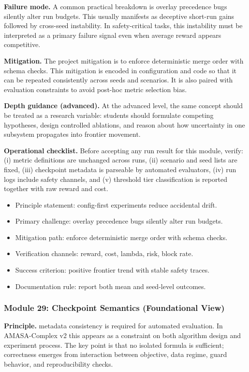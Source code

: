 \documentclass[conference]{IEEEtran}
\begin{document}
\textbf{Failure mode.} A common practical breakdown is overlay precedence bugs silently alter run budgets. This usually manifests as deceptive short-run gains followed by cross-seed instability. In safety-critical tasks, this instability must be interpreted as a primary failure signal even when average reward appears competitive.

\textbf{Mitigation.} The project mitigation is to enforce deterministic merge order with schema checks. This mitigation is encoded in configuration and code so that it can be repeated consistently across seeds and scenarios. It is also paired with evaluation constraints to avoid post-hoc metric selection bias.

\textbf{Depth guidance (advanced).} At the advanced level, the same concept should be treated as a research variable: students should formulate competing hypotheses, design controlled ablations, and reason about how uncertainty in one subsystem propagates into frontier movement.

\textbf{Operational checklist.} Before accepting any run result for this module, verify: (i) metric definitions are unchanged across runs, (ii) scenario and seed lists are fixed, (iii) checkpoint metadata is parseable by automated evaluators, (iv) run logs include safety channels, and (v) threshold tier classification is reported together with raw reward and cost.

\begin{itemize}[leftmargin=*]
  \item Principle statement: config-first experiments reduce accidental drift.
  \item Primary challenge: overlay precedence bugs silently alter run budgets.
  \item Mitigation path: enforce deterministic merge order with schema checks.
  \item Verification channels: reward, cost, lambda, risk, block rate.
  \item Success criterion: positive frontier trend with stable safety traces.
  \item Documentation rule: report both mean and seed-level outcomes.
\end{itemize}


\subsubsection{Module 29: Checkpoint Semantics (Foundational View)}
\textbf{Principle.} metadata consistency is required for automated evaluation. In AMASA-Complex v2 this appears as a constraint on both algorithm design and experiment process. The key point is that no isolated formula is sufficient; correctness emerges from interaction between objective, data regime, guard behavior, and reproducibility checks.
\end{document}
